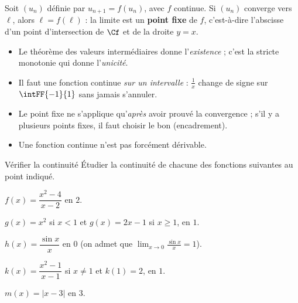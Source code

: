 \begin{theoreme}
Soit $(u_n)$ définie par $u_{n+1}=f(u_n)$, avec $f$ continue. Si $(u_n)$ converge vers $\ell$, alors $\ell=f(\ell)$ :
la limite est un \textbf{point fixe} de $f$, c'est-à-dire l'abscisse d'un point d'intersection de $\Cf$ et de la droite $y=x$.
\end{theoreme}

\begin{attention}
\begin{itemize}[label={\color{otOrange}\textbullet},leftmargin=1.4em,itemsep=0.6mm,topsep=0.5mm]
  \item Le théorème des valeurs intermédiaires donne l'\emph{existence} ; c'est la stricte monotonie qui donne l'\emph{unicité}.
  \item Il faut une fonction continue \emph{sur un intervalle} : $\frac1x$ change de signe sur $\intFF{-1}{1}$ sans jamais s'annuler.
  \item Le point fixe ne s'applique qu'\emph{après} avoir prouvé la convergence ; s'il y a plusieurs points fixes, il faut choisir le bon (encadrement).
  \item Une fonction continue n'est pas forcément dérivable.
\end{itemize}
\end{attention}

\exercices
{}

\begin{exercice}[1]{Vérifier la continuité}
Étudier la continuité de chacune des fonctions suivantes au point indiqué.
\begin{questions}
  \item $f(x)=\dfrac{x^{2}-4}{x-2}$ en $2$.
  \item $g(x)=x^{2}$ si $x<1$ et $g(x)=2x-1$ si $x\geq1$, en $1$.
  \item $h(x)=\dfrac{\sin x}{x}$ en $0$ (on admet que $\displaystyle\lim_{x\to0}\frac{\sin x}{x}=1$).
  \item $k(x)=\dfrac{x^{2}-1}{x-1}$ si $x\neq1$ et $k(1)=2$, en $1$.
  \item $m(x)=|x-3|$ en $3$.
\end{questions}
\end{exercice}


